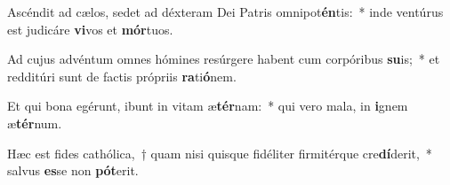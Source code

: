 \item Ascéndit ad cælos, sedet ad déxteram Dei Patris omnipot\textbf{én}tis:~* inde ventúrus est judicáre \textbf{vi}vos et \textbf{mór}tuos.
\item Ad cujus advéntum omnes hómines resúrgere habent cum corpóribus \textbf{su}is;~* et redditúri sunt de factis própriis \textbf{ra}ti\textbf{ó}nem.
\item Et qui bona egérunt, ibunt in vitam æ\textbf{tér}nam:~* qui vero mala, in \textbf{i}gnem æ\textbf{tér}num.
\item Hæc est fides cathólica,~† quam nisi quisque fidéliter firmitérque cre\textbf{dí}derit,~* salvus \textbf{es}se non \textbf{pót}erit.
